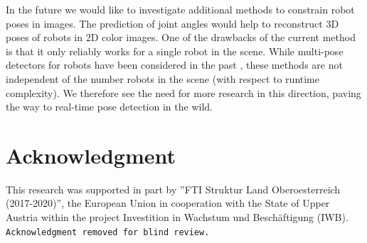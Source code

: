 \documentclass[conference]{IEEEtran}
\begin{document}
In the future we would like to investigate additional methods to constrain robot poses in images. The prediction of joint angles would help to reconstruct 3D poses of robots in 2D color images. One of the drawbacks of the current method is that it only reliably works for a single robot in the scene. While multi-pose detectors for robots have been considered in the past \cite{cheind2019disp}, these methods are not independent of the number robots in the scene (with respect to runtime complexity). We therefore see the need for more research in this direction, paving the way to real-time pose detection in the wild.

\section*{Acknowledgment}
\iffinalcopy
This research was supported in part by ”FTI Struktur Land Oberoesterreich (2017-2020)”, the European Union in cooperation with the State of Upper Austria within the project Investition in Wachstum und Beschäftigung (IWB).
\else
\texttt{Acknowledgment removed for blind review.}
\fi

\small


\end{document}

